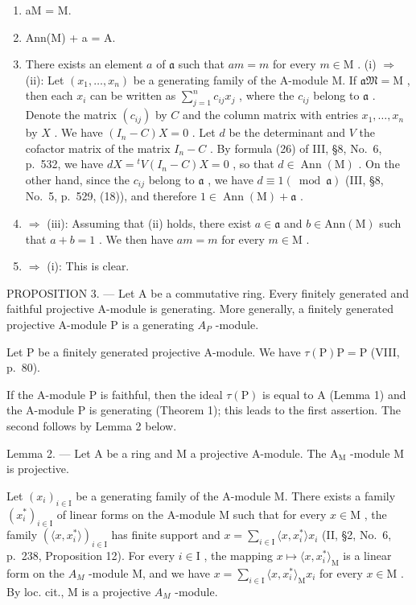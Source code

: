 \begin{enumerate}
\def\labelenumi{(\roman{enumi})}
\item
  aM = M.
\item
  Ann(M) + a = A.
\item
  There exists an element \(a\) of \(\mathfrak{a}\) such that \(am = m\) for every \(m \in \mathrm{M}\) . (i) \(\Rightarrow\) (ii): Let \((x_1, \ldots, x_n)\) be a generating family of the A-module M. If \(\mathfrak{aM} = \mathrm{M}\) , then each \(x_i\) can be written as \(\sum_{j=1}^{n} c_{ij} x_j\) , where the \(c_{ij}\) belong to \(\mathfrak{a}\) . Denote the matrix \((c_{ij})\) by \(C\) and the column matrix with entries \(x_1, \ldots, x_n\) by \(X\) . We have \((I_n - C)X = 0\) . Let \(d\) be the determinant and \(V\) the cofactor matrix of the matrix \(I_n - C\) . By formula (26) of III, §8, No.~6, p.~532, we have \(dX = {}^t V(I_n - C)X = 0\) , so that \(d \in \operatorname{Ann}(\mathrm{M})\) . On the other hand, since the \(c_{ij}\) belong to \(\mathfrak{a}\) , we have \(d \equiv 1 (\bmod \mathfrak{a})\) (III, §8, No.~5, p.~529, (18)), and therefore \(1 \in \operatorname{Ann}(\mathrm{M}) + \mathfrak{a}\) .
\item
  \(\Rightarrow\) (iii): Assuming that (ii) holds, there exist \(a\in \mathfrak{a}\) and \(b\in \mathrm{Ann}(\mathrm{M})\) such that \(a + b = 1\) . We then have \(am = m\) for every \(m\in \mathrm{M}\) .
\item
  \(\Rightarrow\) (i): This is clear.
\end{enumerate}

PROPOSITION 3. --- Let A be a commutative ring. Every finitely generated and faithful projective A-module is generating. More generally, a finitely generated projective A-module P is a generating \(A_{P}\) -module.

Let P be a finitely generated projective A-module. We have \(\tau(\mathrm{P})\mathrm{P}=\mathrm{P}\) (VIII, p.~80).

If the A-module P is faithful, then the ideal \(\tau(\mathrm{P})\) is equal to A (Lemma 1) and the A-module P is generating (Theorem 1); this leads to the first assertion. The second follows by Lemma 2 below.

Lemma 2. --- Let A be a ring and M a projective A-module. The \(\mathrm{A_M}\) -module M is projective.

Let \((x_{i})_{i\in\mathrm{I}}\) be a generating family of the A-module M. There exists a family \((x_{i}^{*})_{i\in\mathrm{I}}\) of linear forms on the A-module M such that for every \(x\in\mathrm{M}\) , the family \((\langle x,x_{i}^{*}\rangle)_{i\in\mathrm{I}}\) has finite support and \(x=\sum_{i\in\mathrm{I}}\langle x,x_{i}^{*}\rangle x_{i}\) (II, §2, No.~6, p.~238, Proposition 12). For every \(i\in\mathrm{I}\) , the mapping \(x\mapsto\langle x,x_{i}^{*}\rangle_{\mathrm{M}}\) is a linear form on the \(A_{M}\) -module M, and we have \(x=\sum_{i\in\mathrm{I}}\langle x,x_{i}^{*}\rangle_{\mathrm{M}}x_{i}\) for every \(x\in\mathrm{M}\) . By loc. cit., M is a projective \(A_{M}\) -module.

